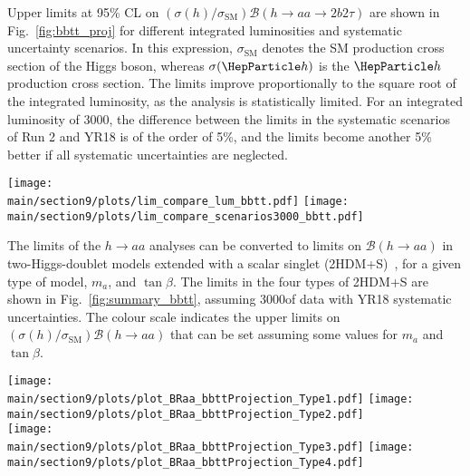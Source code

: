 Upper limits at 95\% CL on $(\sigma(h)/\sigma_{\textrm{SM}}) \mathcal{B}(h \to aa \to 2b2\tau)$ are shown in Fig.~\ref{fig:bbtt_proj} for different integrated luminosities and systematic uncertainty scenarios. In this expression, $\sigma_\textrm{SM}$ denotes the SM production cross section of the Higgs boson, whereas $\sigma(\Ph)$ is the $\Ph$ production cross section.
The limits improve proportionally to the square root of the integrated luminosity,
as the analysis is statistically limited. For an integrated luminosity of 3000\fbinv, the difference between the limits in the  systematic scenarios of Run 2 and YR18 is of the order of 5\%, and the limits become another 5\% better if all systematic uncertainties are neglected.

\begin{figure*}[hbpt]
\centering
        \texttt{[image: \\main/section9/plots/lim\_compare\_lum\_bbtt.pdf]}
        \texttt{[image: \\main/section9/plots/lim\_compare\_scenarios3000\_bbtt.pdf]}\\
    \caption{Left: Projected expected limits on $(\sigma(h)/\sigma_{\textrm{SM}})$ times the branching fraction for $h\to aa\to 2b 2\tau$, for 36, 300, and 3000\fbinv. Right: Projected expected limits $(\sigma(h)/\sigma_{\textrm{SM}}) \mathcal{B}(h\to aa \to 2b2\tau)$, comparing different scenarios for systematic uncertainties for an integrated luminosity of 3000\fbinv.}
    \label{fig:bbtt_proj}
\end{figure*}

The limits of the $h\to aa$ analyses can be converted to limits on $\mathcal{B}(h\to aa)$
in two-Higgs-doublet models extended with
a scalar singlet (2HDM+S)~\cite{PhysRevD.90.075004}, for a given type of model, $m_a$, and $\tan\beta$. The limits in the four types of 2HDM+S are shown
in Fig.~\ref{fig:summary_bbtt}, assuming 3000\fbinv of data with YR18 systematic uncertainties. The colour scale
indicates the upper limits on $(\sigma(h)/\sigma_{\textrm{SM}}) \mathcal{B}(h\to aa)$ that can be set assuming some values for $m_a$ and $\tan\beta$.

\begin{figure*}[hbpt]
\centering
        \texttt{[image: \\main/section9/plots/plot\_BRaa\_bbttProjection\_Type1.pdf]}
        \texttt{[image: \\main/section9/plots/plot\_BRaa\_bbttProjection\_Type2.pdf]} \\
        \texttt{[image: \\main/section9/plots/plot\_BRaa\_bbttProjection\_Type3.pdf]}
        \texttt{[image: \\main/section9/plots/plot\_BRaa\_bbttProjection\_Type4.pdf]}
    \caption{Expected upper limits on $(\sigma(h)/\sigma_{\textrm{SM}}) \mathcal{B}(h\to aa)$ for 3000 fb$^{-1}$ of data with YR18 systematic uncertainties for the $2b 2\tau$ final state in 2HDM+S type-1 (top left), type-2 (top right), type-3 (bottom left), and type-4 (bottom right).}
    \label{fig:summary_bbtt}
\end{figure*}



